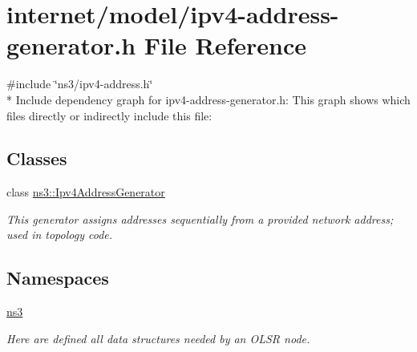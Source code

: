 \hypertarget{ipv4-address-generator_8h}{}\section{internet/model/ipv4-\/address-\/generator.h File Reference}
\label{ipv4-address-generator_8h}
{\ttfamily \#include \char`\"{}ns3/ipv4-\/address.\+h\char`\"{}}\\*
Include dependency graph for ipv4-\/address-\/generator.h\+:
This graph shows which files directly or indirectly include this file\+:
\subsection*{Classes}
\begin{DoxyCompactItemize}
\item 
class \hyperlink{classns3_1_1Ipv4AddressGenerator}{ns3\+::\+Ipv4\+Address\+Generator}
\begin{DoxyCompactList}\small\item\em This generator assigns addresses sequentially from a provided network address; used in topology code. \end{DoxyCompactList}\end{DoxyCompactItemize}
\subsection*{Namespaces}
\begin{DoxyCompactItemize}
\item 
 \hyperlink{namespacens3}{ns3}
\begin{DoxyCompactList}\small\item\em Here are defined all data structures needed by an O\+L\+SR node. \end{DoxyCompactList}\end{DoxyCompactItemize}
